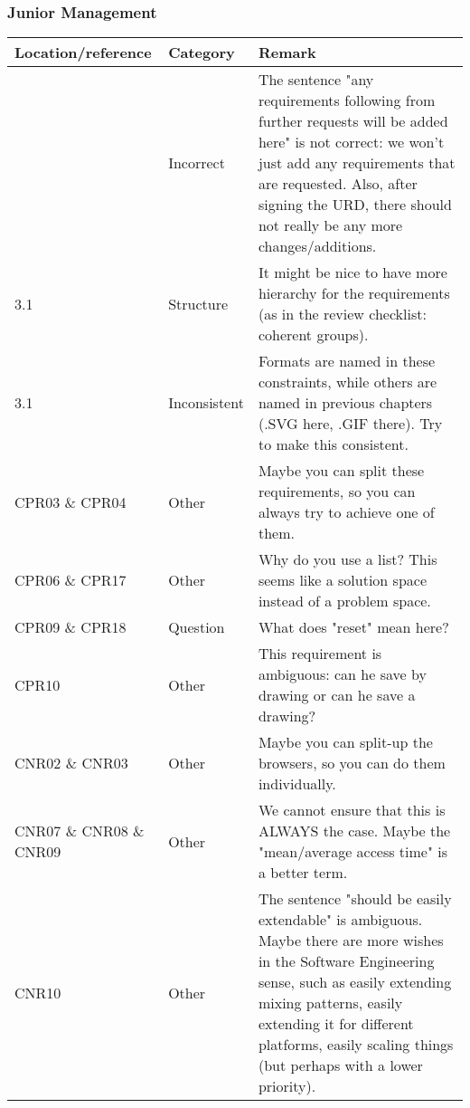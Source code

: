 \subsubsection*{Junior Management}
\begin{longtable}{l|l|p{}}
Location/reference & Category & Remark\\
\hline
\hline
\endhead
\hline
\endfoot
3 & Incorrect & The sentence "any requirements following from further requests will be added here" is not correct: we won't just add any requirements that are requested. Also, after signing the URD, there should not really be any more changes/additions. \\
3.1 & Structure & It might be nice to have more hierarchy for the requirements (as in the review checklist: coherent groups). \\
3.1 & Inconsistent & Formats are named in these constraints, while others are named in previous chapters (.SVG here, .GIF there). Try to make this consistent. \\
CPR03 \& CPR04 & Other & Maybe you can split these requirements, so you can always try to achieve one of them. \\
CPR06 \& CPR17 & Other & Why do you use a list? This seems like a solution space instead of a problem space.\\
CPR09 \& CPR18 & Question & What does "reset" mean here? \\
CPR10 & Other & This requirement is ambiguous: can he save by drawing or can he save a drawing? \\
CNR02 \& CNR03 & Other & Maybe you can split-up the browsers, so you can do them individually. \\
CNR07 \& CNR08 \& CNR09 & Other & We cannot ensure that this is ALWAYS the case. Maybe the "mean/average access time" is a better term. \\
CNR10 & Other & The sentence "should be easily extendable" is ambiguous. Maybe there are more wishes in the Software Engineering sense, such as easily extending mixing patterns, easily extending it for different platforms, easily scaling things (but perhaps with a lower priority). \\
\end{longtable}


